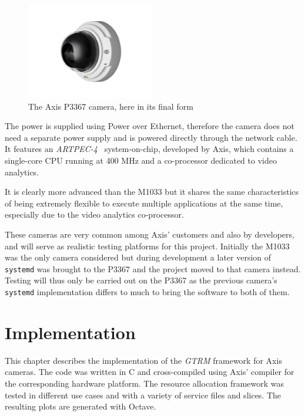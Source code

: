 \documentclass[nobiblatex]{LTHthesis}
\begin{document}
\begin{figure}[h]
	\centering
	\includegraphics[width=0.5\textwidth]{p3367incase}
	\caption{The Axis P3367 camera, here in its final form}
	\label{fig:P3367case}
\end{figure}

The power is supplied using Power over Ethernet, therefore the camera does 
not need a separate power supply and is powered directly through the network
cable. It features an \emph{ARTPEC-4}~\cite{artpec-4} system-on-chip, developed 
by Axis, which contains a single-core CPU running at 400 MHz and a 
co-processor dedicated to video analytics.

It is clearly more advanced than the M1033 but it shares the same
characteristics of being extremely flexible to execute multiple applications
at the same time, especially due to the video analytics co-processor.

These cameras are very common among Axis' customers and also by
developers, and will serve as realistic testing platforms for this project. 
Initially the M1033 was the only camera considered but during development a 
later version of \texttt{systemd} was brought to the P3367 and the project moved to 
that camera instead. Testing will thus only be carried out on the P3367 
as the previous camera's \texttt{systemd} implementation differs to much to bring the software to both of them.

\chapter{Implementation}
\label{chp:development}

This chapter describes the implementation of the \emph{GTRM} framework for
Axis cameras. The code was written in C and cross-compiled 
using Axis' compiler for the corresponding hardware platform. The resource
allocation framework was tested in different use cases and with a
variety of service files and slices. The resulting plots are generated with
Octave.
\end{document}

